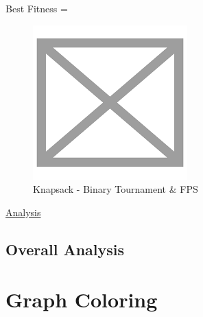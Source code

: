 \documentclass[11pt, letterpaper]{article}
\begin{document}
Best Fitness = 
\begin{figure}[H]
    \centering
    \includegraphics[scale = 0.6]{images/placeHolder.png}
    \caption {Knapsack - Binary Tournament \& FPS}
    \label {fig:kpBF}
\end{figure}

\underline{Analysis}
\subsection {Overall Analysis}

\section{Graph Coloring}
\end{document}
